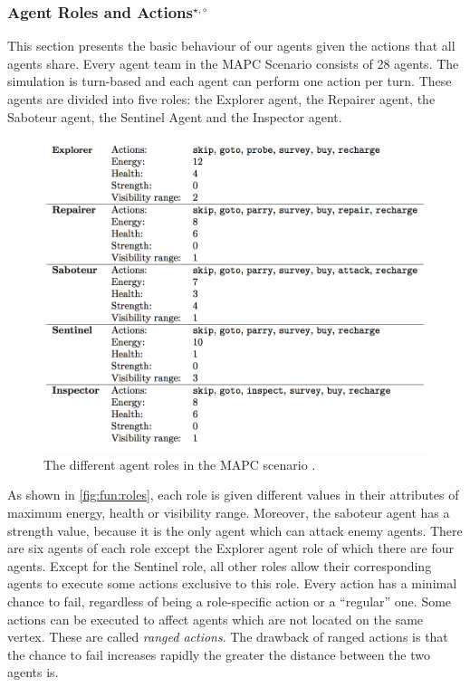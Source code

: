 \subsubsection[Agent Roles and Actions]{Agent Roles and Actions$^{\star,\circ}$}\label{fun:mapc_roles}
This section presents the basic behaviour of our agents given the actions that all agents share.
Every agent team in the MAPC Scenario consists of 28 agents.
The simulation is turn-based and each agent can perform one action per turn.
These agents are divided into five roles: the Explorer agent, the Repairer agent, the Saboteur agent, the Sentinel Agent and the Inspector agent.
\begin{figure}[ht]
  \centering
  \includegraphics[width=0.9\linewidth]{images/roles.png}
  \caption{The different agent roles in the MAPC scenario \cite{ahlbrecht_mapc_2014}.}
  \label{fig:fun:roles}
\end{figure}
As shown in \autoref{fig:fun:roles}, each role is given different values in their attributes of maximum energy, health or visibility range.
Moreover, the saboteur agent has a strength value, because it is the only agent which can attack enemy agents.
There are six agents of each role except the Explorer agent role of which there are four agents.
Except for the Sentinel role, all other roles allow their corresponding agents to execute some actions exclusive to this role.
Every action has a minimal chance to fail, regardless of being a role-specific action or a \enquote{regular} one.
Some actions can be executed to affect agents which are not located on the same vertex.
These are called \emph{ranged actions}.
The drawback of ranged actions is that the chance to fail increases rapidly the greater the distance between the two agents is.

